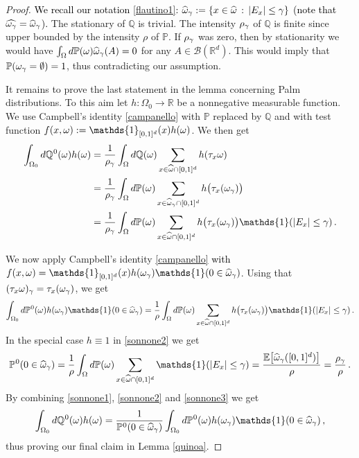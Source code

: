 \documentclass[12pt,a4paper,reqno]{amsart}
\newcommand{\cB}{\ensuremath{\mathcal B}}
\newcommand{\bbE}{{\ensuremath{\mathbb E}} }
\newcommand{\bbP}{{\ensuremath{\mathbb P}} }
\newcommand{\bbQ}{{\ensuremath{\mathbb Q}} }
\newcommand{\bbR}{{\ensuremath{\mathbb R}} }
\let\O=\Omega \let\P=\Pi   \let\Ps=\Psi \let\Si=\Sigma \let\X=\Xi
\newcommand{\rosso}{\textcolor{black}} %
\newcommand{\vvv}{\textcolor{black}} %
\newcommand{\be}{\begin{equation}}
\newcommand{\en}{\end{equation}}
\newcommand{\vpz}{\vvv{\bbP^{\hspace{0.013cm}0} }}
\newcommand{\vqz}{\vvv{\bbQ^{\hspace{0.013cm}0} }}
\begin{document}
\begin{proof}  \rosso{We recall  our notation \eqref{flautino1}:  $\widehat{\omega}_\gamma:=\{x\in \widehat {\omega}\,:\, |E_x| \leq \gamma\}$
(note that $\widehat{\omega_\gamma}=\widehat{\omega}_\gamma$).}
The stationary of $\bbQ $ is trivial. The intensity $\rho_\gamma$  of $\bbQ $  is finite since  upper bounded by the intensity  $\rho$ of $\bbP$. If  $\rho_\gamma $ was zero, then by stationarity we would have $\int_\O d\bbP(\o)  \widehat{\o}_\g (A)=0 $ for any $A\in \cB(\bbR^d)$. This would imply   that $\bbP( \o_\g =\emptyset)=1$, thus contradicting our assumption.

It remains to  prove the last statement in the lemma concerning Palm distributions.
To this aim let $h : \O_0 \to \bbR$ be a nonnegative measurable function. 
We  use Campbell's identity \eqref{campanello}  with  $\bbP$ replaced by $\bbQ$ and with test function $f(x,\o):= \mathds{1}_{[0,1]^d}(x) h(\o)$. We then get 
\be\label{sonnone1}
\begin{split}
\int _{\O_0} d \vqz (\o) h(\o) & = \frac{1}{\rho_\g} \int _\O d \bbQ (\o) \sum_{x\in \widehat{\o}\cap [0,1]^d} h(\t_x \o)\\
& = \frac{1}{\rho_\g} \int _\O d \bbP(\o) \sum_{x\in \widehat{\o}_\g \cap [0,1]^d}  h\bigl(\t_x (\o_\g)\bigr) \\
&= \frac{1}{\rho_\g} \int _\O d \bbP(\o) \sum_{x\in \widehat{\o}\cap [0,1]^d}h\bigl(\t_x (\o_\g) \bigr)\mathds{1}(|E_x|\leq \g) \,.
\end{split}
\en


We now apply Campbell's identity   \rosso{\eqref{campanello}  with} $f(x,\o)=  \mathds{1}_{[0,1]^d}(x) h(\o_\g) \mathds{1} ( 0\in \widehat{\o}_\g)$. Using that $(\tau_x \omega)_\gamma=\tau_x (\omega_\gamma)$, we get 
\begin{equation}\label{sonnone2}
   \int _{\O_0} d\vpz ( \o) h(\o_\g) \mathds{1}(0\in \widehat{\o}_\g )  =\frac{1}{\rho} \int _{\O}d \bbP(\o)  \sum_{x\in \widehat{\o}\cap [0,1]^d}   h\bigl(\t_x(\o_\g)\bigr) \mathds{1}(|E_x| \leq \g) \,.
 \end{equation}
 In the special case $h\equiv 1$  in \eqref{sonnone2} we get
 \begin{equation}\label{sonnone3}
   \vpz(0\in \widehat{\o}_\g ) 
   =  \frac{1}{\rho} \int _{\O}d \bbP(\o)  \sum_{x\in \widehat{\o}\cap [0,1]^d}   \mathds{1}(|E_x| \leq \g)=
   \frac{\bbE\bigl[ \widehat{\o}_\g([0,1]^d)\big]}{\rho}
 = \frac{\rho_\g}{\rho}\,. 
 \end{equation}
 By combining \eqref{sonnone1}, \eqref{sonnone2} and \eqref{sonnone3} we get 
 \be
 \int _{\O_0} d \vqz (\o) h(\o)=\frac{1}{ \vpz (0\in \widehat \o_\g ) }  \int _{\O_0} d\vpz ( \o) h(\o_\g) \mathds{1}(0\in \widehat \o_\g ) \,,
 \en
 thus proving our final claim in Lemma \ref{quinoa}.
\end{proof}
\end{document}
